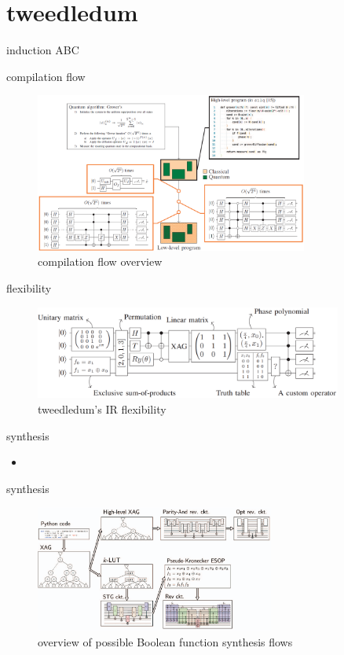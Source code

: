 \documentclass[aspectratio=1610]{beamer}
\begin{document}
\section{tweedledum}
\begin{frame}{induction}  
  ABC 
\end{frame}
\begin{frame}{compilation flow}
  \begin{figure}[htbq]
    \centering
    \includegraphics[width=0.8\textwidth]{figure/work_flow.png}
    \caption{compilation flow overview} 
    \label{fig-compilation}
  \end{figure}
\end{frame}
\begin{frame}{flexibility}
  \begin{figure}[htbq]
    \centering
    \includegraphics[width=0.9\textwidth]{figure/flex.png}
    \caption{tweedledum's IR flexibility} 
    \label{fig-flex}
  \end{figure}
\end{frame}
\begin{frame}{synthesis}
  \begin{itemize}
    \item 
  \end{itemize}  
\end{frame}
\begin{frame}{synthesis}
  \begin{figure}[htbq]
    \centering
    \includegraphics[width=0.7\textwidth]{figure/boolean.png}
    \caption{overview of possible Boolean function synthesis flows} 
    \label{fig-boolean}
  \end{figure}
\end{frame}
\end{document}

